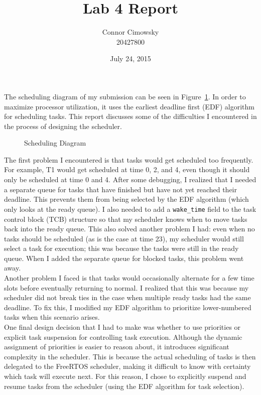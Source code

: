 \documentclass[11pt]{report}
\title{Lab 4 Report}
\author{Connor Cimowsky\protect\\20427800}
\date{July 24, 2015}
\begin{document}
\maketitle

The scheduling diagram of my submission can be seen in Figure~\ref{fig:timing}.
In order to maximize processor utilization, it uses the earliest deadline first
(EDF) algorithm for scheduling tasks. This report discusses some of the
difficulties I encountered in the process of designing the scheduler.\\

\begin{figure}[h]
	\centering
	\caption{Scheduling Diagram}
	\label{fig:timing}
\end{figure}

The first problem I encountered is that tasks would get scheduled too
frequently. For example, T1 would get scheduled at time 0, 2, and 4, even
though it should only be scheduled at time 0 and 4. After some debugging, I
realized that I needed a separate queue for tasks that have finished but have
not yet reached their deadline. This prevents them from being selected by the
EDF algorithm (which only looks at the ready queue). I also needed to add a
\texttt{wake\_time} field to the task control block (TCB) structure so that my
scheduler knows when to move tasks back into the ready queue. This also solved
another problem I had: even when no tasks should be scheduled (as is the case
at time 23), my scheduler would still select a task for execution; this was
because the tasks were still in the ready queue. When I added the separate
queue for blocked tasks, this problem went away.\\

Another problem I faced is that tasks would occasionally alternate for a few
time slots before eventually returning to normal. I realized that this was
because my scheduler did not break ties in the case when multiple ready tasks
had the same deadline. To fix this, I modified my EDF algorithm to prioritize
lower-numbered tasks when this scenario arises.\\

One final design decision that I had to make was whether to use priorities or
explicit task suspension for controlling task execution. Although the dynamic
assignment of priorities is easier to reason about, it introduces significant
complexity in the scheduler. This is because the actual scheduling of tasks is
then delegated to the FreeRTOS scheduler, making it difficult to know with
certainty which task will execute next. For this reason, I chose to explicitly
suspend and resume tasks from the scheduler (using the EDF algorithm for task
selection).
\end{document}
